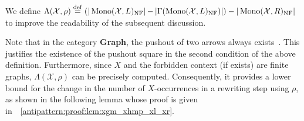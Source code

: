 We define $\Lambda(\mathcal{X},\rho) \overset{\operatorname{def}}{=} (|\operatorname{Mono}(\mathcal{X},L)_{\operatorname{NF}}| \mathop{-} 
    |\Gamma(\operatorname{Mono}(\mathcal{X},L)_{\operatorname{NF}})|) -
   |\operatorname{Mono}(\mathcal{X},R)_{\operatorname{NF}}|$ to improve the readability of the subsequent discussion.

Note that in the category \textbf{Graph}, the pushout of two arrows always exists~\cite[p.188]{corradini1997algebraic}. This justifies the existence of the pushout square in the second condition of the above definition.
Furthermore, since $X$ and the forbidden context (if exists) are finite graphs, $\Lambda(\mathcal{X},\rho)$ can be precisely computed. Consequently, it provides a lower bound for the change in the number of $X$-occurrences in a rewriting step using $\rho$, as shown in the following lemma whose proof is given in~\textsection~\ref{antipattern:proof:lem:xgm_xhmp_xl_xr}.

